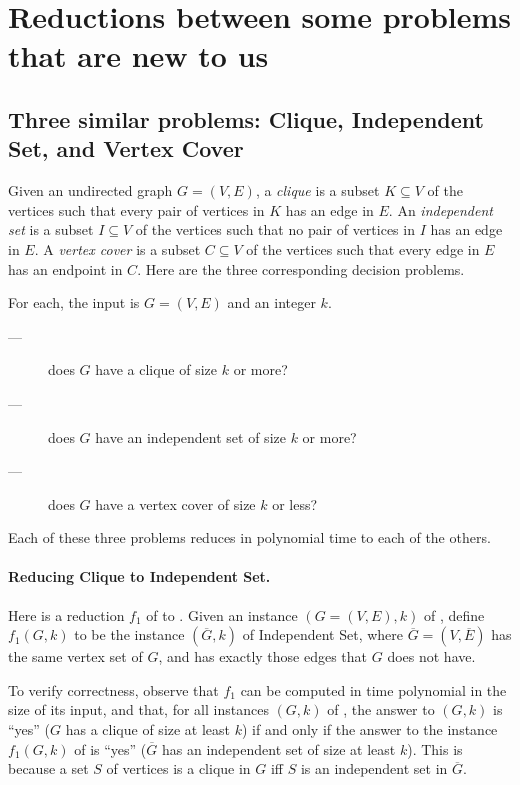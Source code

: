 \documentclass[11pt]{article}
\begin{document}
\section{Reductions between some problems that are new to us}\label{np: sec: reductions 2}

\subsection{Three similar problems: Clique, Independent Set, and Vertex Cover}
Given an undirected graph $G=(V,E)$,
a \emph{clique} is a subset $K\subseteq V$ of the vertices such that every
pair of vertices in $K$ has an edge in $E$.
An \emph{independent set} is a subset $I\subseteq V$ of the vertices such that
no pair of vertices in $I$ has an edge in $E$.
A \emph{vertex cover} is a subset $C\subseteq V$ of the vertices such that
every edge in $E$ has an endpoint in $C$.
Here are the three corresponding decision problems.

For each, the input is $G=(V,E)$ and an integer $k$.
\begin{description}
\item[---] does $G$ have a clique of size $k$ or more?
\item[---] does $G$ have an independent set of size $k$ or more? 
\item[---] does $G$ have a vertex cover of size $k$ or less?
\end{description}

Each of these three problems reduces in polynomial time to each of the others.

\paragraph{Reducing Clique to Independent Set.} 
Here is a reduction $f_1$ of  to .
Given an instance $(G=(V,E),k)$ of ,
define $f_1(G,k)$ to be the instance $(\overline G, k)$ of {\sc Independent Set},
where $\overline G = (V, \overline E)$
has the same vertex set of $G$, and has exactly those edges that $G$ does not have.

To verify correctness, observe that $f_1$ can be computed in time polynomial in the size of its input,
and that, for all instances $(G,k)$ of ,
the answer to $(G,k)$ is ``yes''
($G$ has a clique of size at least $k$)
if and only if
the answer to the instance $f_1(G,k)$ of  is ``yes''
($\overline G$ has an independent set of size at least $k$).
This is because a set $S$ of vertices is a clique in $G$
iff $S$ is an independent set in $\overline G$.
\end{document}
